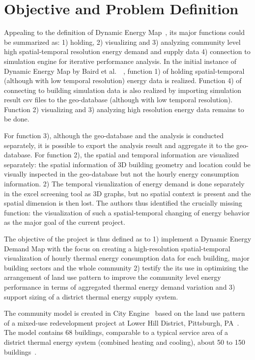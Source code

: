 \section{Objective and Problem Definition}
Appealing to the definition of Dynamic Energy Map~\cite{baird2014},
its major functions could be summarized as: 1) holding, 2) visualizing
and 3) analyzing community level high spatial-temporal resolution
energy demand and supply data 4) connection to simulation engine for
iterative performance analysis. In the initial instance of Dynamic
Energy Map by Baird et al.\ ~\cite{baird2014}, function 1) of holding
spatial-temporal (although with low temporal resolution) energy data
is realized. Function 4) of connecting to building simulation data is
also realized by importing simulation result csv files to the
geo-database (although with low temporal resolution). Function 2)
visualizing and 3) analyzing high resolution energy data remains to be
done.

For function 3), although the geo-database and the analysis is
conducted separately, it is possible to export the analysis result and
aggregate it to the geo-database. For function 2), the spatial and
temporal information are visualized separately: the spatial
information of 3D building geometry and location could be visually
inspected in the geo-database but not the hourly energy consumption
information. 2) The temporal visualization of energy demand is done
separately in the excel screening tool as 3D graphs, but no spatial
context is present and the spatial dimension is then lost. The authors
thus identified the crucially missing function: the visualization of
such a spatial-temporal changing of energy behavior as the major goal
of the current project.

The objective of the project is thus defined as to 1) implement a
Dynamic Energy Demand Map with the focus on creating a high-resolution
spatial-temporal visualization of hourly thermal energy consumption
data for each building, major building sectors and the whole community
2) testify the its use in optimizing the arrangement of land use
pattern to improve the community level energy performance in terms of
aggregated thermal energy demand variation and 3) support sizing of a
district thermal energy supply system.

The community model is created in City Engine~\cite{cityEngine2015}
based on the land use pattern of a mixed-use redevelopment project at
Lower Hill District, Pittsburgh, PA~\cite{Ramesh2013}. The model
contains 68 buildings, comparable to a typical service area of a
district thermal energy system (combined heating and cooling), about
50 to 150 buildings~\cite{IDEA2005}.

